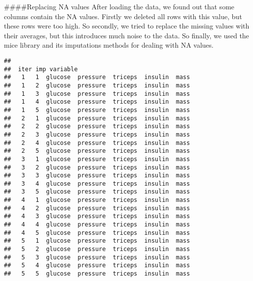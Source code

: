 \documentclass[
]{article}
\newenvironment{Shaded}{\begin{snugshade}}{\end{snugshade}}
\newcommand{\DataTypeTok}[1]{\textcolor[rgb]{0.13,0.29,0.53}{#1}}
\newcommand{\DecValTok}[1]{\textcolor[rgb]{0.00,0.00,0.81}{#1}}
\newcommand{\KeywordTok}[1]{\textcolor[rgb]{0.13,0.29,0.53}{\textbf{#1}}}
\newcommand{\NormalTok}[1]{#1}
\newcommand{\OperatorTok}[1]{\textcolor[rgb]{0.81,0.36,0.00}{\textbf{#1}}}
\newcommand{\StringTok}[1]{\textcolor[rgb]{0.31,0.60,0.02}{#1}}
\begin{document}
\#\#\#\#Replacing NA values After loading the data, we found out that
some columns contain the NA values. Firstly we deleted all rows with
this value, but these rows were too high. So secondly, we tried to
replace the missing values with their averages, but this introduces much
noise to the data. So finally, we used the mice library and its
imputations methods for dealing with NA values.

\begin{Shaded}
\end{Shaded}

\begin{verbatim}
## 
##  iter imp variable
##   1   1  glucose  pressure  triceps  insulin  mass
##   1   2  glucose  pressure  triceps  insulin  mass
##   1   3  glucose  pressure  triceps  insulin  mass
##   1   4  glucose  pressure  triceps  insulin  mass
##   1   5  glucose  pressure  triceps  insulin  mass
##   2   1  glucose  pressure  triceps  insulin  mass
##   2   2  glucose  pressure  triceps  insulin  mass
##   2   3  glucose  pressure  triceps  insulin  mass
##   2   4  glucose  pressure  triceps  insulin  mass
##   2   5  glucose  pressure  triceps  insulin  mass
##   3   1  glucose  pressure  triceps  insulin  mass
##   3   2  glucose  pressure  triceps  insulin  mass
##   3   3  glucose  pressure  triceps  insulin  mass
##   3   4  glucose  pressure  triceps  insulin  mass
##   3   5  glucose  pressure  triceps  insulin  mass
##   4   1  glucose  pressure  triceps  insulin  mass
##   4   2  glucose  pressure  triceps  insulin  mass
##   4   3  glucose  pressure  triceps  insulin  mass
##   4   4  glucose  pressure  triceps  insulin  mass
##   4   5  glucose  pressure  triceps  insulin  mass
##   5   1  glucose  pressure  triceps  insulin  mass
##   5   2  glucose  pressure  triceps  insulin  mass
##   5   3  glucose  pressure  triceps  insulin  mass
##   5   4  glucose  pressure  triceps  insulin  mass
##   5   5  glucose  pressure  triceps  insulin  mass
\end{verbatim}
\end{document}
